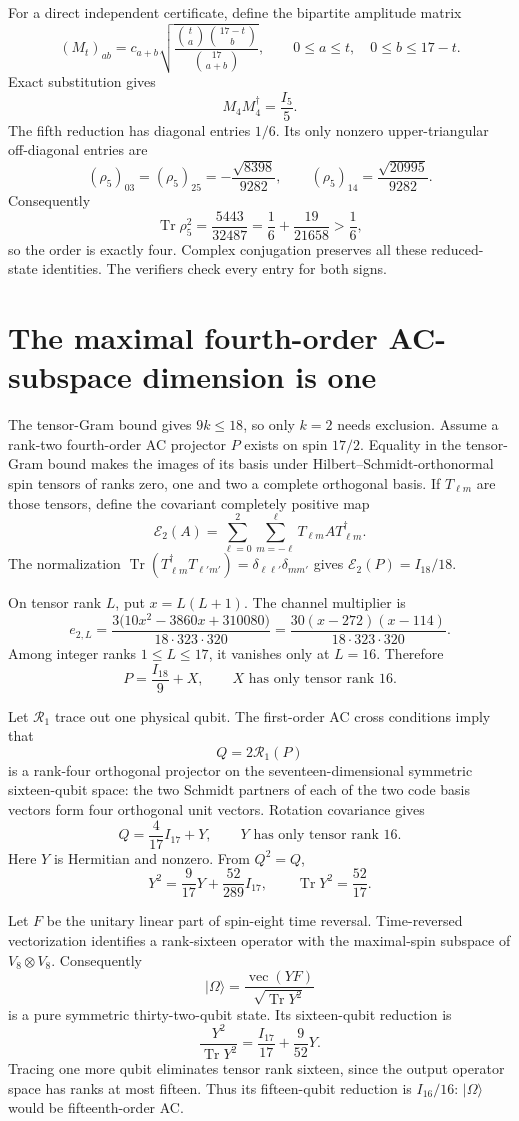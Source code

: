 \documentclass[11pt]{article}
\newcommand{\Tr}{\operatorname{Tr}}
\begin{document}
For a direct independent certificate, define the bipartite amplitude matrix
\[
 (M_t)_{ab}=c_{a+b}
 \sqrt{\frac{\binom ta\binom{17-t}b}{\binom{17}{a+b}}},\qquad
 0\le a\le t,\quad0\le b\le17-t.
\]
Exact substitution gives
\[
 M_4M_4^\dagger=\frac{I_5}{5}.
\]
The fifth reduction has diagonal entries $1/6$. Its only nonzero
upper-triangular off-diagonal entries are
\[
 (\rho_5)_{03}=(\rho_5)_{25}=-\frac{\sqrt{8398}}{9282},\qquad
 (\rho_5)_{14}=\frac{\sqrt{20995}}{9282}.
\]
Consequently
\[
 \Tr\rho_5^2=\frac{5443}{32487}
 =\frac16+\frac{19}{21658}>\frac16,
\]
so the order is exactly four. Complex conjugation preserves all these
reduced-state identities. The verifiers check every entry for both signs.

\section{The maximal fourth-order AC-subspace dimension is one}
The tensor-Gram bound gives $9k\le18$, so only $k=2$ needs exclusion.
Assume a rank-two fourth-order AC projector $P$ exists on spin $17/2$.
Equality in the tensor-Gram bound makes the images of its basis under
Hilbert--Schmidt-orthonormal spin tensors of ranks zero, one and two a
complete orthogonal basis. If $T_{\ell m}$ are those tensors, define the
covariant completely positive map
\[
 \mathcal E_2(A)=\sum_{\ell=0}^2\sum_{m=-\ell}^{\ell}
 T_{\ell m}A T_{\ell m}^\dagger.
\]
The normalization $\Tr(T_{\ell m}^\dagger T_{\ell'm'})=
\delta_{\ell\ell'}\delta_{mm'}$ gives
$\mathcal E_2(P)=I_{18}/18$.

On tensor rank $L$, put $x=L(L+1)$. The channel multiplier is
\[
 e_{2,L}=\frac{3\bigl(10x^2-3860x+310080\bigr)}{18\cdot323\cdot320}
 =\frac{30(x-272)(x-114)}{18\cdot323\cdot320}.
\]
Among integer ranks $1\le L\le17$, it vanishes only at $L=16$.
Therefore
\[
 P=\frac{I_{18}}9+X,\qquad X\text{ has only tensor rank }16.
\]

Let $\mathcal R_1$ trace out one physical qubit. The first-order AC cross
conditions imply that
\[
 Q=2\mathcal R_1(P)
\]
is a rank-four orthogonal projector on the seventeen-dimensional symmetric
sixteen-qubit space: the two Schmidt partners of each of the two code
basis vectors form four orthogonal unit vectors. Rotation covariance gives
\[
 Q=\frac4{17}I_{17}+Y,\qquad Y\text{ has only tensor rank }16.
\]
Here $Y$ is Hermitian and nonzero. From $Q^2=Q$,
\[
 Y^2=\frac9{17}Y+\frac{52}{289}I_{17},\qquad
 \Tr Y^2=\frac{52}{17}.
\]

Let $F$ be the unitary linear part of spin-eight time reversal.
Time-reversed vectorization identifies a rank-sixteen operator with the
maximal-spin subspace of $V_8\otimes V_8$. Consequently
\[
 |\Omega\rangle=\frac{\operatorname{vec}(YF)}{\sqrt{\Tr Y^2}}
\]
is a pure symmetric thirty-two-qubit state. Its sixteen-qubit reduction is
\[
 \frac{Y^2}{\Tr Y^2}=\frac{I_{17}}{17}+\frac9{52}Y.
\]
Tracing one more qubit eliminates tensor rank sixteen, since the output
operator space has ranks at most fifteen. Thus its fifteen-qubit reduction
is $I_{16}/16$: $|\Omega\rangle$ would be fifteenth-order AC.
\end{document}
